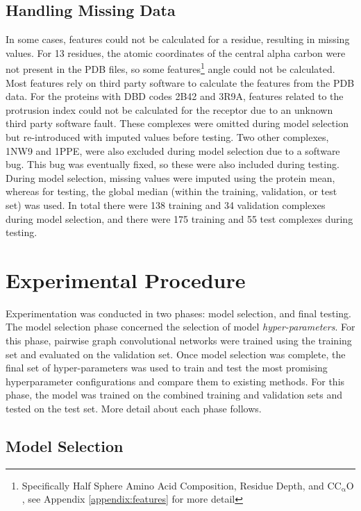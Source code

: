\subsection{Handling Missing Data}
In some cases, features could not be calculated for a residue, resulting in missing values.
For 13 residues, the atomic coordinates of the central alpha carbon were not present in the PDB files, so some features\footnote{Specifically Half Sphere Amino Acid Composition, Residue Depth, and $\mathrm{C C_{\alpha} O}$, see Appendix \ref{appendix:features} for more detail} angle could not be calculated.
Most features rely on third party software to calculate the features from the PDB data.
For the proteins with DBD codes 2B42 and 3R9A, features related to the protrusion index could not be calculated for the receptor due to an unknown third party software fault.
These complexes were omitted during model selection but re-introduced with imputed values before testing.
Two other complexes, 1NW9 and 1PPE, were also excluded during model selection due to a software bug.
This bug was eventually fixed, so these were also included during testing. 
During model selection, missing values were imputed using the protein mean, whereas for testing, the global median (within the training, validation, or test set) was used.
In total there were 138 training and 34 validation complexes during model selection, and there were 175 training and 55 test complexes during testing.

\section{Experimental Procedure}

Experimentation was conducted in two phases: model selection, and final testing.
The model selection phase concerned the selection of model \emph{hyper-parameters}.
For this phase, pairwise graph convolutional networks were trained using the training set and evaluated on the validation set.
Once model selection was complete, the final set of hyper-parameters was used to train and test the most promising hyperparameter configurations and compare them to existing methods.
For this phase, the model was trained on the combined training and validation sets and tested on the test set.
More detail about each phase follows.


\subsection{Model Selection}

